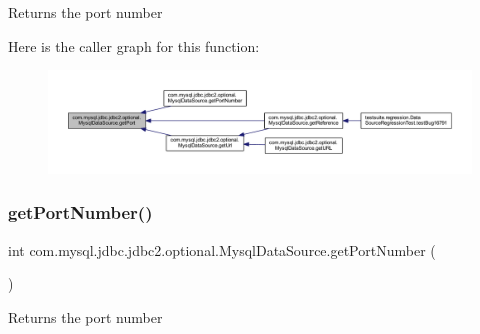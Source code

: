 \begin{DoxyReturn}{Returns}
the port number 
\end{DoxyReturn}
Here is the caller graph for this function\+:
\nopagebreak
\begin{figure}[H]
\begin{center}
\leavevmode
\includegraphics[width=350pt]{classcom_1_1mysql_1_1jdbc_1_1jdbc2_1_1optional_1_1_mysql_data_source_a156d5423e0ec869617b665908e932bf6_icgraph}
\end{center}
\end{figure}
\mbox{\label{classcom_1_1mysql_1_1jdbc_1_1jdbc2_1_1optional_1_1_mysql_data_source_ae5f33a812875972ef3269a3c0681c600}} 
\subsubsection{\texorpdfstring{get\+Port\+Number()}{getPortNumber()}}
{\footnotesize\ttfamily int com.\+mysql.\+jdbc.\+jdbc2.\+optional.\+Mysql\+Data\+Source.\+get\+Port\+Number (\begin{DoxyParamCaption}{ }\end{DoxyParamCaption})}

Returns the port number

